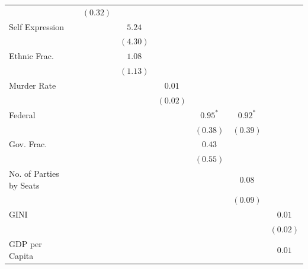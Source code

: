 \documentclass[a4paper]{article}\usepackage[]{graphicx}\usepackage[]{color}
\begin{document}
\begin{table}
\begin{center}
\begin{tabular}{l c c c c c c c }
                        &               & $(0.32)$      &              &             &              &              &             \\
Self Expression         &               &               & $5.24$       &             &              &              &             \\
                        &               &               & $(4.30)$     &             &              &              &             \\
Ethnic Frac.            &               &               & $1.08$       &             &              &              &             \\
                        &               &               & $(1.13)$     &             &              &              &             \\
Murder Rate             &               &               &              & $0.01$      &              &              &             \\
                        &               &               &              & $(0.02)$    &              &              &             \\
Federal                 &               &               &              &             & $0.95^{*}$   & $0.92^{*}$   &             \\
                        &               &               &              &             & $(0.38)$     & $(0.39)$     &             \\
Gov. Frac.              &               &               &              &             & $0.43$       &              &             \\
                        &               &               &              &             & $(0.55)$     &              &             \\
No. of Parties by Seats &               &               &              &             &              & $0.08$       &             \\
                        &               &               &              &             &              & $(0.09)$     &             \\
GINI                    &               &               &              &             &              &              & $0.01$      \\
                        &               &               &              &             &              &              & $(0.02)$    \\
GDP per Capita          &               &               &              &             &              &              & $0.01$      \\

\end{tabular}
\end{center}
\end{table}
\end{document}
